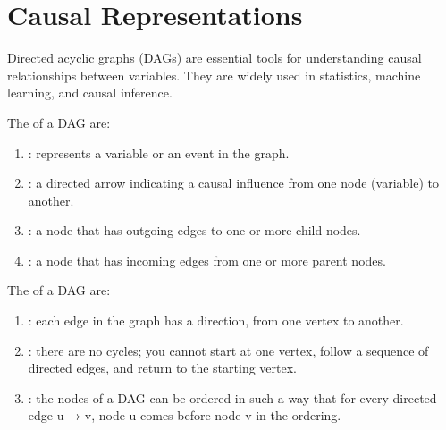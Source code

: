 \documentclass[letterpaper,10pt,english]{jupyterBook}
\begin{document}
\chapter{Causal Representations}
\label{\detokenize{notebooks/DAG:causal-representations}}\label{\detokenize{notebooks/DAG::doc}}
\sphinxAtStartPar
Directed acyclic graphs (DAGs) are essential tools for understanding causal relationships between variables. They are widely used in statistics, machine learning, and causal inference.

\sphinxAtStartPar
The  of a DAG are:
\begin{enumerate}
%
\item {} 
\sphinxAtStartPar
{}: represents a variable or an event in the graph.

\item {} 
\sphinxAtStartPar
{}: a directed arrow indicating a causal influence from one node (variable) to another.

\item {} 
\sphinxAtStartPar
{}: a node that has outgoing edges to one or more child nodes.

\item {} 
\sphinxAtStartPar
{}: a node that has incoming edges from one or more parent nodes.

\end{enumerate}

\sphinxAtStartPar
The  of a DAG are:
\begin{enumerate}
%
\item {} 
\sphinxAtStartPar
{}: each edge in the graph has a direction, from one vertex to another.

\item {} 
\sphinxAtStartPar
{}: there are no cycles; you cannot start at one vertex, follow a sequence of directed edges, and return to the starting vertex.

\item {} 
\sphinxAtStartPar
{}: the nodes of a DAG can be ordered in such a way that for every directed edge u → v, node u comes before node v in the ordering.

\end{enumerate}
\end{document}
